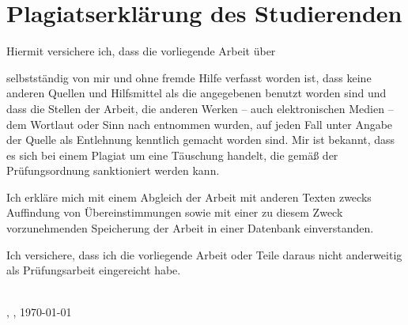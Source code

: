 \chapter*{Plagiatserklärung des Studierenden}
Hiermit versichere ich, dass die vorliegende Arbeit über 
\begin{center}
\textit{\printtitle}
\end{center}
selbstständig von mir und ohne fremde Hilfe verfasst worden ist, dass keine anderen Quellen und Hilfsmittel als die angegebenen benutzt worden sind und dass die Stellen der Arbeit, die anderen Werken – auch elektronischen Medien – dem Wortlaut oder Sinn nach entnommen wurden, auf jeden Fall unter Angabe der Quelle als Entlehnung kenntlich gemacht worden sind. Mir ist bekannt, dass es sich bei einem Plagiat um eine Täuschung handelt, die gemäß der Prüfungsordnung sanktioniert werden kann.

Ich erkläre mich mit einem Abgleich der Arbeit mit anderen Texten zwecks Auffindung von Übereinstimmungen sowie mit einer zu diesem Zweck vorzunehmenden Speicherung der Arbeit in einer Datenbank einverstanden. 

Ich versichere, dass ich die vorliegende Arbeit oder Teile daraus nicht anderweitig als Prüfungsarbeit eingereicht habe.



\vspace{0.75cm}
\parbox{17em}{\hrulefill} \\
\printname, \printcity, \today


